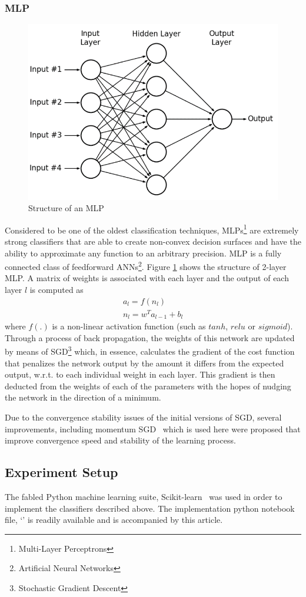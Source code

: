 \documentclass[journal,onecolumn]{IEEEtran}
\begin{document}
\subsubsection{MLP}
\begin{figure}
  \centering
  \includegraphics[width=0.4\linewidth]{figures/mlp.png}
  \caption{Structure of an MLP}
  \label{fig:mlp}
\end{figure}
Considered to be one of the oldest classification techniques, MLPs\footnote{Multi-Layer Perceptrons} are extremely strong classifiers that are
able to create non-convex decision surfaces and have the ability to approximate any function to an arbitrary precision. MLP is a fully connected class of
feedforward ANNs\footnote{Artificial Neural Networks}. Figure \ref{fig:mlp} shows the structure of 2-layer MLP. A matrix of weights is associated with each layer and the output of each layer $l$ is computed as
\begin{equation}
  \begin{gathered}
    a_l = f(n_l)\\
    n_l = w^T a_{l-1} + b_l
  \end{gathered}
\end{equation}
where $f(.)$ is a non-linear activation function (such as $tanh$, $relu$ or $sigmoid$). Through a process of back propagation, the weights
of this network are updated by means of SGD\footnote{Stochastic Gradient Descent} which, in essence, calculates the gradient of the cost function that penalizes the
network output by the amount it differs from the expected output, w.r.t. to each individual weight in each layer. This gradient is then deducted
from the weights of each of the parameters with the hopes of nudging the network in the direction of a minimum.

Due to the convergence stability issues of the initial versions of SGD, several improvements, including momentum SGD~\cite{sgdm} which is used here were proposed
that improve convergence speed and stability of the learning process.

\subsection{Experiment Setup}
The fabled Python machine learning suite, Scikit-learn~\cite{sklearn} was used in order to implement the classifiers described above.
The implementation python notebook file, `' is readily available and is accompanied by this article.
\end{document}

